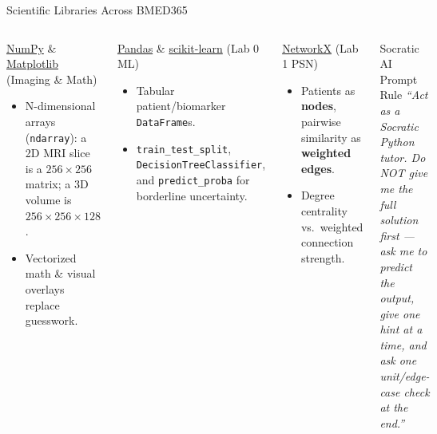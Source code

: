 \documentclass[aspectratio=169, 10pt]{beamer}
\begin{document}
\begin{frame}{Scientific Libraries Across BMED365}
    \begin{columns}[T,onlytextwidth]
        \begin{block}{\href{https://numpy.org/}{NumPy} \& \href{https://matplotlib.org/}{Matplotlib} (Imaging \& Math)}
            \footnotesize
            \begin{itemize}
                \item N-dimensional arrays (\texttt{ndarray}): a 2D MRI slice is a $256\times 256$ matrix; a 3D volume is $256\times 256\times 128$.
                \item Vectorized math \& visual overlays replace guesswork.
            \end{itemize}
        \end{block}

        \begin{block}{\href{https://pandas.pydata.org/}{Pandas} \& \href{https://scikit-learn.org/}{scikit-learn} (Lab 0 ML)}
            \footnotesize
            \begin{itemize}
                \item Tabular patient/biomarker \texttt{DataFrame}s.
                \item \texttt{train\_test\_split}, \texttt{DecisionTreeClassifier}, and \texttt{predict\_proba} for borderline uncertainty.
            \end{itemize}
        \end{block}

        \begin{block}{\href{https://networkx.org/}{NetworkX} (Lab 1 PSN)}
            \footnotesize
            \begin{itemize}
                \item Patients as \textbf{nodes}, pairwise similarity as \textbf{weighted edges}.
                \item Degree centrality vs.\ weighted connection strength.
            \end{itemize}
        \end{block}

        \begin{exampleblock}{\footnotesize Socratic AI Prompt Rule}
            \footnotesize
            \textit{``Act as a Socratic Python tutor. Do NOT give me the full solution first --- ask me to predict the output, give one hint at a time, and ask one unit/edge-case check at the end.''}
        \end{exampleblock}
    \end{columns}
\end{frame}
\end{document}
